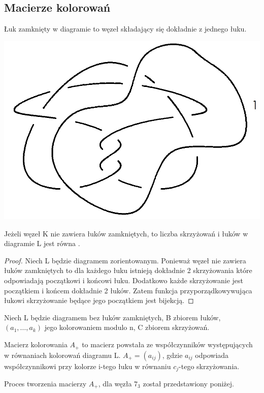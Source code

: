 \subsection{Macierze kolorowań}
\begin{definicja}
Łuk zamknięty w diagramie to węzeł składający się dokładnie z jednego łuku.
\end{definicja}
\begin{center}
\includegraphics[scale=0.2]{2/Obrazy/Clossedcurve} \\

\end{center}

\begin{lemat}
Jeżeli węzeł K nie zawiera łuków zamkniętych, to liczba skrzyżowań i łuków w diagramie L jest równa .
\end{lemat}
\begin{proof}
Niech L będzie diagramem zorientowanym. Ponieważ węzeł nie zawiera łuków zamkniętych to dla każdego łuku istnieją dokładnie 2 skrzyżowania które odpowiadają początkowi i końcowi łuku. Dodatkowo każde skrzyżowanie jest początkiem i końcem dokładnie 2 łuków. Zatem funkcja przyporządkowywująca łukowi skrzyżowanie będące jego początkiem jest bijekcją.
\end{proof}


Niech L będzie diagramem bez łuków zamkniętych, B zbiorem łuków, $( a_{1}, \ldots, a_{k})$ jego kolorowaniem modulo n, C zbiorem skrzyżowań.  
\begin{definicja}
Macierz kolorowania $A_{+}$ to macierz powstała ze współczynników występujących w równaniach kolorowań diagramu L. $A_{+}=(a_{ij})$, gdzie  $a_{ij}$ odpowiada współczynnikowi przy kolorze i-tego łuku w równaniu $c_{j}$-tego skrzyżowania. 
\end{definicja}
Proces tworzenia macierzy $A_{+}$, dla węzła $7_{3}$ został przedstawiony poniżej. \\

